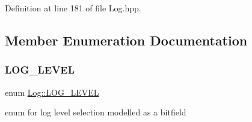 Definition at line 181 of file Log.\+hpp.



\subsection{Member Enumeration Documentation}
\mbox{\label{class_log_ad671761fe5e2e030871610bd6dfecd79}} 
\subsubsection{\texorpdfstring{LOG\_LEVEL}{LOG\_LEVEL}}
{\footnotesize\ttfamily enum \mbox{\hyperlink{class_log_ad671761fe5e2e030871610bd6dfecd79}{Log\+::\+L\+O\+G\+\_\+\+L\+E\+V\+EL}}}



enum for log level selection modelled as a bitfield 

